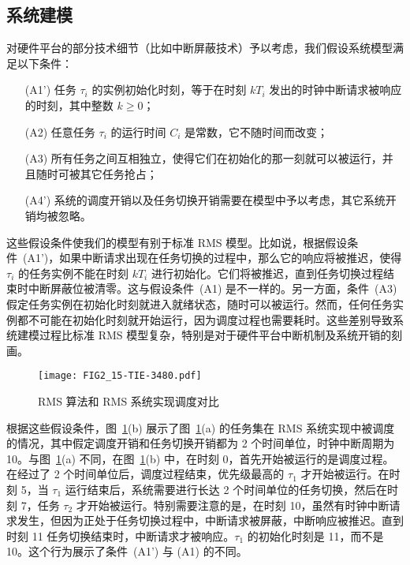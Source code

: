 \subsection{系统建模}
\label{s:formalism}


对硬件平台的部分技术细节（比如中断屏蔽技术）予以考虑，我们假设系统模型满足以下条件：

\begin{enumerate}
\item [(A1')] 任务 $\tau_i$ 的实例初始化时刻，等于在时刻 $kT_i$ 发出的时钟中断请求被响应的时刻，其中整数 $k\ge 0$；
\item [(A2)] 任意任务 $\tau_i$ 的运行时间 $C_i$ 是常数，它不随时间而改变；
\item [(A3)] 所有任务之间互相独立，使得它们在初始化的那一刻就可以被运行，并且随时可被其它任务抢占；
\item [(A4')] 系统的调度开销以及任务切换开销需要在模型中予以考虑，其它系统开销均被忽略。
\end{enumerate}


这些假设条件使我们的模型有别于标准 RMS 模型。比如说，根据假设条件~(A1')，如果中断请求出现在任务切换的过程中，那么它的响应将被推迟，使得 $\tau_i$ 的任务实例不能在时刻 $kT_i$ 进行初始化。它们将被推迟，直到任务切换过程结束时中断屏蔽位被清零。这与假设条件~(A1) 是不一样的。另一方面，条件~(A3) 假定任务实例在初始化时刻就进入就绪状态，随时可以被运行。然而，任何任务实例都不可能在初始化时刻就开始运行，因为调度过程也需要耗时。这些差别导致系统建模过程比标准 RMS 模型复杂，特别是对于硬件平台中断机制及系统开销的刻画。

\begin{figure}[ht]
\centering
\texttt{[image: FIG2\_15-TIE-3480.pdf]}
\caption{RMS 算法和 RMS 系统实现调度对比}
\label{f:example}
\end{figure}

根据这些假设条件，图~\ref{f:example}(b) 展示了图~\ref{f:example}(a) 的任务集在 RMS 系统实现中被调度的情况，其中假定调度开销和任务切换开销都为 2 个时间单位，时钟中断周期为 10。与图~\ref{f:example}(a) 不同，在图~\ref{f:example}(b) 中，在时刻 0，首先开始被运行的是调度过程。在经过了 2 个时间单位后，调度过程结束，优先级最高的 $\tau_1$ 才开始被运行。在时刻 5，当 $\tau_1$ 运行结束后，系统需要进行长达 2 个时间单位的任务切换，然后在时刻 7，任务 $\tau_2$ 才开始被运行。特别需要注意的是，在时刻 10，虽然有时钟中断请求发生，但因为正处于任务切换过程中，中断请求被屏蔽，中断响应被推迟。直到时刻 11 任务切换结束时，中断请求才被响应。$\tau_1$ 的初始化时刻是 11，而不是 10。这个行为展示了条件~(A1') 与 (A1) 的不同。

